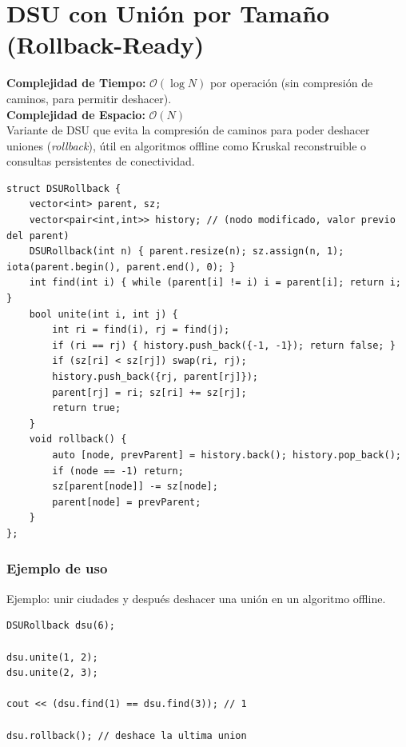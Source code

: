 \documentclass[10pt,twocolumn,letterpaper]{report}
\begin{document}
\section{DSU con Unión por Tamaño (Rollback-Ready)}
\textbf{Complejidad de Tiempo:} $\mathcal{O}(\log N)$ por operación (sin compresión de caminos, para permitir deshacer). \\
\textbf{Complejidad de Espacio:} $\mathcal{O}(N)$ \\
Variante de DSU que evita la compresión de caminos para poder deshacer uniones (\textit{rollback}), útil en algoritmos offline como Kruskal reconstruible o consultas persistentes de conectividad.
\begin{lstlisting}
struct DSURollback {
    vector<int> parent, sz;
    vector<pair<int,int>> history; // (nodo modificado, valor previo del parent)
    DSURollback(int n) { parent.resize(n); sz.assign(n, 1); iota(parent.begin(), parent.end(), 0); }
    int find(int i) { while (parent[i] != i) i = parent[i]; return i; }
    bool unite(int i, int j) {
        int ri = find(i), rj = find(j);
        if (ri == rj) { history.push_back({-1, -1}); return false; }
        if (sz[ri] < sz[rj]) swap(ri, rj);
        history.push_back({rj, parent[rj]});
        parent[rj] = ri; sz[ri] += sz[rj];
        return true;
    }
    void rollback() {
        auto [node, prevParent] = history.back(); history.pop_back();
        if (node == -1) return;
        sz[parent[node]] -= sz[node];
        parent[node] = prevParent;
    }
};
\end{lstlisting}
\subsubsection*{Ejemplo de uso}
Ejemplo: unir ciudades y después deshacer una unión en un algoritmo offline.
\begin{lstlisting}
DSURollback dsu(6);

dsu.unite(1, 2);
dsu.unite(2, 3);

cout << (dsu.find(1) == dsu.find(3)); // 1

dsu.rollback(); // deshace la ultima union
\end{lstlisting}
\end{document}

